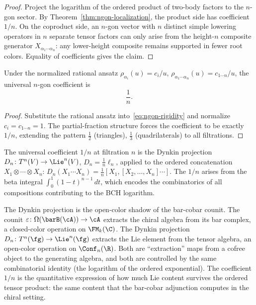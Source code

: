 \begin{proof}
Project the logarithm of the ordered product of two-body factors to the
$n$-gon sector. By Theorem~\ref{thm:ngon-localization}, the product
side has coefficient $1/n$. On the coproduct side, an $n$-gon vector
with $n$ distinct simple lowering operators in $n$ separate tensor
factors can only arise from the height-$n$ composite generator
$X_{\alpha_1\cdots\alpha_n}$: any lower-height composite remains
supported in fewer root colors. Equality of coefficients gives the
claim.
\end{proof}

\begin{corollary}
\label{cor:universal-ngon-coefficient}
Under the normalized rational ansatz $\rho_{\alpha_i}(u)=c_i/u$,
$\rho_{\alpha_1\cdots\alpha_n}(u)=c_{1\cdots n}/u$, the universal
$n$-gon coefficient is
\begin{equation}\label{eq:universal-1/n}
\boxed{\frac{1}{n}.}
\end{equation}
\end{corollary}

\begin{proof}
Substitute the rational ansatz into~\eqref{eq:ngon-rigidity} and
normalize $c_i=c_{1\cdots n}=1$. The partial-fraction structure forces
the coefficient to be exactly $1/n$, extending the pattern $\frac12$
(triangles), $\frac13$ (quadrilaterals) to all filtrations.
\end{proof}

\begin{remark}
\label{rem:dynkin-counit}
The universal coefficient $1/n$ at filtration $n$ is the Dynkin
projection $D_n\colon T^n(V)\to\Lie^n(V)$, $D_n=\frac{1}{n}\ell_n$,
applied to the ordered concatenation $X_1\otimes\cdots\otimes X_n$:
$D_n(X_1\cdots X_n) = \frac{1}{n}[X_1,[X_2,\ldots,X_n]\cdots]$. The $1/n$
arises from the beta integral $\int_0^1(1-t)^{n-1}\,dt$, which
encodes the combinatorics of all compositions contributing to the BCH
logarithm.

The Dynkin projection is the open-color shadow of the bar-cobar counit.
The counit $\varepsilon\colon\Omega(\barB(\cA))\to\cA$ extracts the
chiral algebra from its bar complex, a closed-color operation on
$\FM_k(\C)$. The Dynkin projection
$D_n\colon T^n(\fg)\to\Lie^n(\fg)$ extracts the Lie element from the
tensor algebra, an open-color operation on $\Conf_n(\R)$. Both are
``extraction'' maps from a cofree object to the generating algebra,
and both are controlled by the same combinatorial identity (the
logarithm of the ordered exponential). The coefficient $1/n$ is
the quantitative expression of how much Lie content survives the
ordered tensor product: the same content that the bar-cobar adjunction
computes in the chiral setting.
\end{remark}

